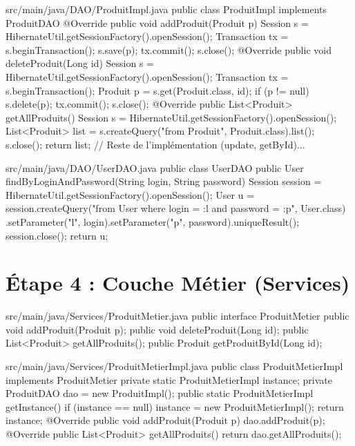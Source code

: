 \documentclass[12pt,a4paper]{article}
\begin{document}
\begin{codeholder}{src/main/java/DAO/ProduitImpl.java}
public class ProduitImpl implements ProduitDAO {
    @Override
    public void addProduit(Produit p) {
        Session s = HibernateUtil.getSessionFactory().openSession();
        Transaction tx = s.beginTransaction();
        s.save(p); tx.commit(); s.close();
    }
    @Override
    public void deleteProduit(Long id) {
        Session s = HibernateUtil.getSessionFactory().openSession();
        Transaction tx = s.beginTransaction();
        Produit p = s.get(Produit.class, id);
        if (p != null) s.delete(p);
        tx.commit(); s.close();
    }
    @Override
    public List<Produit> getAllProduits() {
        Session s = HibernateUtil.getSessionFactory().openSession();
        List<Produit> list = s.createQuery("from Produit", Produit.class).list();
        s.close(); return list;
    }
    // Reste de l'implémentation (update, getById)...
}
\end{codeholder}

\begin{codeholder}{src/main/java/DAO/UserDAO.java}
public class UserDAO {
    public User findByLoginAndPassword(String login, String password) {
        Session session = HibernateUtil.getSessionFactory().openSession();
        User u = session.createQuery("from User where login = :l and password = :p", User.class)
                .setParameter("l", login).setParameter("p", password).uniqueResult();
        session.close(); return u;
    }
}
\end{codeholder}

\section{Étape 4 : Couche Métier (Services)}
\begin{codeholder}{src/main/java/Services/ProduitMetier.java}
public interface ProduitMetier {
    public void addProduit(Produit p);
    public void deleteProduit(Long id);
    public List<Produit> getAllProduits();
    public Produit getProduitById(Long id);
}
\end{codeholder}

\begin{codeholder}{src/main/java/Services/ProduitMetierImpl.java}
public class ProduitMetierImpl implements ProduitMetier {
    private static ProduitMetierImpl instance;
    private ProduitDAO dao = new ProduitImpl();
    public static ProduitMetierImpl getInstance() {
        if (instance == null) instance = new ProduitMetierImpl();
        return instance;
    }
    @Override
    public void addProduit(Produit p) { dao.addProduit(p); }
    @Override
    public List<Produit> getAllProduits() { return dao.getAllProduits(); }
}
\end{codeholder}
\end{document}

